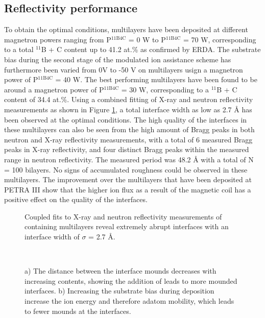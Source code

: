 \subsection{Reflectivity performance}
To obtain the optimal conditions, multilayers have been deposited at different magnetron powers ranging from P$^{\textrm{11B4C}}$ = 0 W to P$^{\textrm{11B4C}}$ = 70 W, corresponding to a total $^{\textrm{11}}$B + C content up to 41.2 at.\% as confirmed by ERDA. The substrate bias during the second stage of the modulated ion assistance scheme has furthermore been varied from 0V to -50 V on multilayers usign a magnetron power of P$^{\textrm{11B4C}}$ = 40 W. The best performing multilayers have been found to be around a magnetron power of P$^{\textrm{11B4C}}$ = 30 W, corresponding to a $^{\textrm{11}}$B + C content of 34.4 at.\%. Using a combined fitting of X-ray and neutron reflectivity measurements as shown in Figure \ref{genx_fits}, a total interface width as low as 2.7 Å has been observed at the optimal conditions. The high quality of the interfaces in these multilayers can also be seen from the high amount of Bragg peaks in both neutron and X-ray reflectivity measurements, with a total of 6 measured Bragg peaks in X-ray reflectivity, and four distinct Bragg peaks within the measured range in neutron reflectivity. The measured period was 48.2 Å with a total of N = 100 bilayers. No signs of accumulated roughness could be observed in these multilayers. The improvement over the multilayers that have been deposited at PETRA III show that the higher ion flux as a result of the magnetic coil has a positive effect on the quality of the interfaces.  
\begin{figure}
	\centering
	\def\svgwidth{\textwidth}
	
	\caption{Coupled fits to X-ray and neutron reflectivity measurements of \BC containing multilayers reveal extremely abrupt interfaces with an interface width of $\sigma$ = 2.7 Å.}
	\label{genx_fits}
\end{figure}
\\
\clearpage
\begin{figure}[b]
	\centering
	\def\svgwidth{\textwidth}
	
	\caption{a) The distance between the interface mounds decreases with increasing \BC contents, showing the addition of \BC leads to more mounded interfaces. b) Increasing the substrate bias during deposition increase the ion energy and therefore adatom mobility, which leads to fewer mounds at the interfaces.}
	\label{GISAXS_summaries}
\end{figure}
